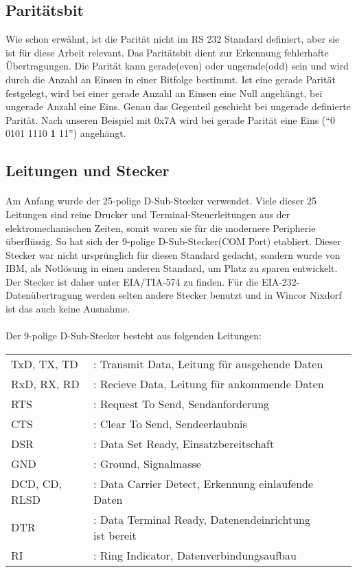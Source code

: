\subsection{Paritätsbit}
Wie schon erwähnt, ist die Parität nicht im RS 232 Standard definiert, aber sie ist für diese Arbeit relevant. Das Paritätsbit dient zur Erkennung fehlerhafte Übertragungen. Die Parität kann gerade(even) oder ungerade(odd) sein und wird durch die Anzahl an Einsen in einer Bitfolge bestimmt. Ist eine gerade Parität festgelegt, wird bei einer gerade Anzahl an Einsen eine Null angehängt, bei ungerade Anzahl eine Eins. Genau das Gegenteil geschieht bei  ungerade definierte Parität. Nach unseren Beispiel mit 0x7A wird bei gerade Parität eine Eins ("`0 0101 1110 \textbf{1} 11"') angehängt.

\subsection{Leitungen und Stecker}
\paragraph{}
Am Anfang wurde der 25-polige D-Sub-Stecker verwendet. Viele dieser 25 Leitungen sind reine Drucker und Terminal-Steuerleitungen aus der elektromechanischen Zeiten, somit waren sie für die modernere Peripherie überflüssig. So hat sich der 9-polige D-Sub-Stecker(COM Port) etabliert. Dieser Stecker war nicht ursprünglich für diesen Standard gedacht, sondern wurde von IBM, als Notlösung in einen anderen Standard, um Platz zu sparen entwickelt. Der Stecker ist daher unter EIA/TIA-574 zu finden. Für die EIA-232-Datenübertragung werden selten andere Stecker benutzt und in Wincor Nixdorf ist das auch keine Ausnahme.


\paragraph{}
Der 9-polige D-Sub-Stecker besteht aus folgenden Leitungen:\\
\begin{tabular}{llll}
\\
TxD, TX, TD &: Transmit Data, Leitung für ausgehende Daten \\
RxD, RX, RD &: Recieve Data, Leitung für ankommende Daten \\
RTS &: Request To Send, Sendanforderung \\
CTS &: Clear To Send, Sendeerlaubnis \\
DSR &: Data Set Ready, Einsatzbereitschaft \\
GND &: Ground, Signalmasse \\
DCD, CD, RLSD &: Data Carrier Detect, Erkennung einlaufende Daten \\
DTR &: Data Terminal Ready, Datenendeinrichtung ist bereit \\
RI &: Ring Indicator, Datenverbindungsaufbau \\

\end{tabular}


